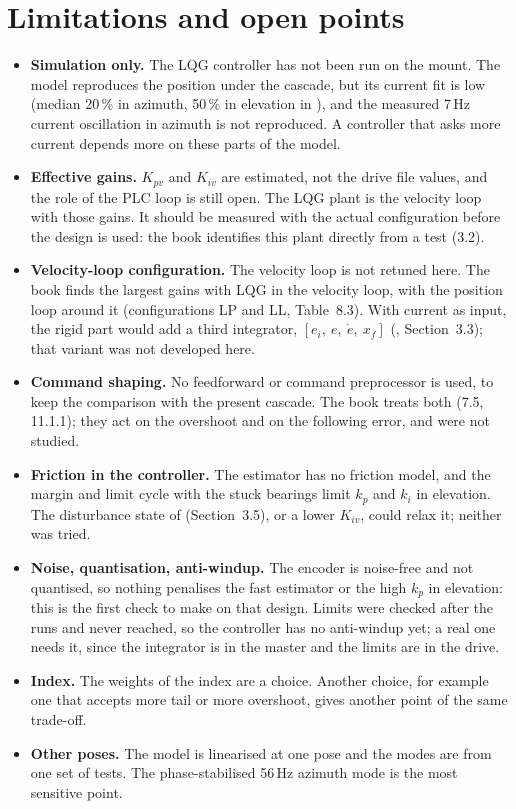 \documentclass[10pt,a4paper]{article}
\numberwithin{equation}{section}
\begin{document}
\section{Limitations and open points}\label{sec:limits}
\begin{itemize}
\item \textbf{Simulation only.} The LQG controller has not been run on the mount. The model reproduces the position under the cascade, but its current fit is low (median 20\,\% in azimuth, 50\,\% in elevation in ), and the measured 7\,Hz current oscillation in azimuth is not reproduced. A controller that asks more current depends more on these parts of the model.
\item \textbf{Effective gains.} $K_{pv}$ and $K_{iv}$ are estimated, not the drive file values, and the role of the PLC loop is still open. The LQG plant is the velocity loop with those gains. It should be measured with the actual configuration before the design is used: the book identifies this plant directly from a test (3.2).
\item \textbf{Velocity-loop configuration.} The velocity loop is not retuned here. The book finds the largest gains with LQG in the velocity loop, with the position loop around it (configurations LP and LL, Table~8.3). With current as input, the rigid part would add a third integrator, $[e_i,\ e,\ \dot e,\ x_f]$ (, Section~3.3); that variant was not developed here.
\item \textbf{Command shaping.} No feedforward or command preprocessor is used, to keep the comparison with the present cascade. The book treats both (7.5, 11.1.1); they act on the overshoot and on the following error, and were not studied.
\item \textbf{Friction in the controller.} The estimator has no friction model, and the margin and limit cycle with the stuck bearings limit $k_p$ and $k_i$ in elevation. The disturbance state of  (Section~3.5), or a lower $K_{iv}$, could relax it; neither was tried.
\item \textbf{Noise, quantisation, anti-windup.} The encoder is noise-free and not quantised, so nothing penalises the fast estimator or the high $k_p$ in elevation: this is the first check to make on that design. Limits were checked after the runs and never reached, so the controller has no anti-windup yet; a real one needs it, since the integrator is in the master and the limits are in the drive.
\item \textbf{Index.} The weights of the index are a choice. Another choice, for example one that accepts more tail or more overshoot, gives another point of the same trade-off.
\item \textbf{Other poses.} The model is linearised at one pose and the modes are from one set of tests. The phase-stabilised 56\,Hz azimuth mode is the most sensitive point.
\end{itemize}
\end{document}
